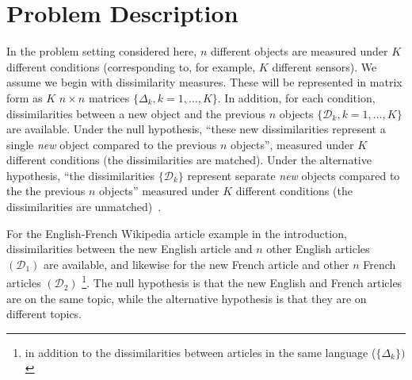 \documentclass[12pt,oneside,final]{thesis}\usepackage[]{graphicx}\usepackage[]{color}
\begin{document}

\section{Problem Description \label{sec:jointembed}}
In the problem setting considered here,  $n$ different objects are measured under $K$ different conditions (corresponding  to, for example, $K$ different sensors). We assume we begin with dissimilarity measures. These will be represented in matrix form as $K$ $n \times n$ matrices $\{\Delta_k,k=1 ,\ldots,K\}$.  In addition, for each condition, dissimilarities between  a new object  and the previous 
$n$ objects $\{\mathcal{D}_k,k=1 ,\ldots,K\}$ are available. Under  the null hypothesis, ``these new dissimilarities represent a single \emph{new} object  compared to the previous $n$ objects'', measured under $K$ different conditions (the dissimilarities are matched). Under the alternative hypothesis, ``the dissimilarities $\{\mathcal{D}_k\}$ represent separate \emph{new} objects compared to the the previous $n$ objects''  measured under $K$ different conditions (the dissimilarities are unmatched)~\cite{JOFC}. %

For the English-French Wikipedia  article example in the introduction,  dissimilarities between the new English article and $n$ other English articles $(\mathcal{D}_1)$ are available, and likewise for the new French article  and other $n$ French articles $(\mathcal{D}_2)$ \footnote{in addition to the dissimilarities between articles in the same language  ($\{\Delta_k\})$ }. The null hypothesis is that the new English and French articles are on the same topic, while the alternative hypothesis is that they are on different topics.
\end{document}
